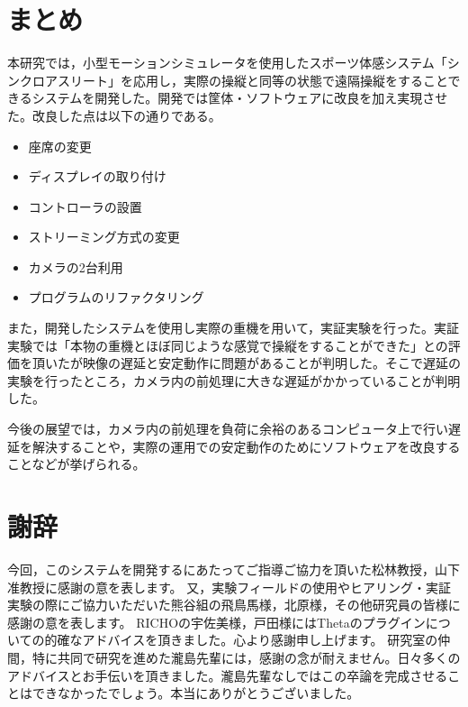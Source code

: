 \documentclass[a4paper,12pt]{jsarticle}
\begin{document}
\section{まとめ}
本研究では，小型モーションシミュレータを使用したスポーツ体感システム「シンクロアスリート」を応用し，実際の操縦と同等の状態で遠隔操縦をすることできるシステムを開発した。開発では筐体・ソフトウェアに改良を加え実現させた。改良した点は以下の通りである。
\begin{itemize}
  \item 座席の変更
  \item ディスプレイの取り付け
  \item コントローラの設置
  \item ストリーミング方式の変更
  \item カメラの2台利用
  \item プログラムのリファクタリング
\end{itemize}

また，開発したシステムを使用し実際の重機を用いて，実証実験を行った。実証実験では「本物の重機とほぼ同じような感覚で操縦をすることができた」との評価を頂いたが映像の遅延と安定動作に問題があることが判明した。そこで遅延の実験を行ったところ，カメラ内の前処理に大きな遅延がかかっていることが判明した。

今後の展望では，カメラ内の前処理を負荷に余裕のあるコンピュータ上で行い遅延を解決することや，実際の運用での安定動作のためにソフトウェアを改良することなどが挙げられる。
\clearpage

\section*{謝辞} %
今回，このシステムを開発するにあたってご指導ご協力を頂いた松林教授，山下准教授に感謝の意を表します。
又，実験フィールドの使用やヒアリング・実証実験の際にご協力いただいた熊谷組の飛鳥馬様，北原様，その他研究員の皆様に感謝の意を表します。
RICHOの宇佐美様，戸田様にはThetaのプラグインについての的確なアドバイスを頂きました。心より感謝申し上げます。
研究室の仲間，特に共同で研究を進めた瀧島先輩には，感謝の念が耐えません。日々多くのアドバイスとお手伝いを頂きました。瀧島先輩なしではこの卒論を完成させることはできなかったでしょう。本当にありがとうございました。

\clearpage
\end{document}
